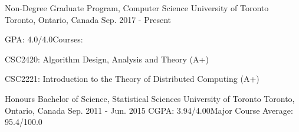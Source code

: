 
\begin{cventries}

  \cventry
    {Non-Degree Graduate Program, Computer Science} %
    {University of Toronto} %
    {Toronto, Ontario, Canada} %
    {Sep. 2017 - Present} %
    {GPA: 4.0/4.0\newline Courses: \newline \hphantom{0}
      \begin{cvitems}
        \item {CSC2420: Algorithm Design, Analysis and Theory (A+)}
        \item {CSC2221: Introduction to the Theory of Distributed Computing (A+)}
      \end{cvitems}
    }
\end{cventries}
\begin{cventries}
  \cventry
    {Honours Bachelor of Science, Statistical Sciences} %
    {University of Toronto} %
    {Toronto, Ontario, Canada} %
    {Sep. 2011 - Jun. 2015} %
    {CGPA: 3.94/4.00\newline Major Course Average: 95.4/100.0}
\end{cventries}
